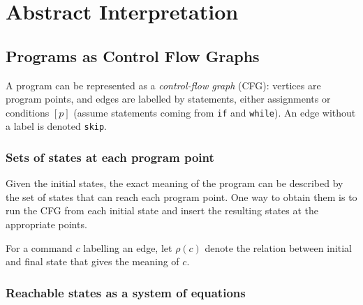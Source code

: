 % 
\chapter{Abstract Interpretation}
 
\section{Programs as Control Flow Graphs}
 
 
A program can be represented as a \emph{control-flow graph} (CFG): vertices are program points, and edges are labelled by statements, either assignments or conditions $[p]$ (assume statements coming from \texttt{if} and \texttt{while}). An edge without a label is denoted \texttt{skip}.
 
\subsection*{Sets of states at each program point}
 
Given the initial states, the exact meaning of the program can be described by the set of states that can reach each program point. One way to obtain them is to run the CFG from each initial state and insert the resulting states at the appropriate points.
 
For a command $c$ labelling an edge, let $\rho(c)$ denote the relation between initial and final state that gives the meaning of $c$.
 
 
\subsection*{Reachable states as a system of equations}
 
